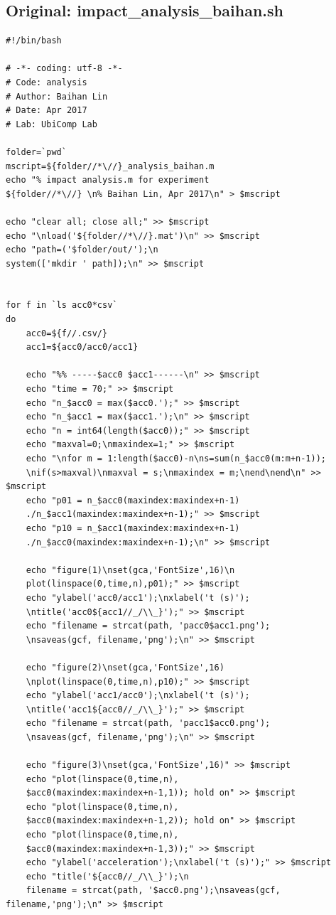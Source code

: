 \documentclass{sigchi}
\begin{document}
\subsection{Original: impact\_analysis\_baihan.sh}\label{ss:ipc_ana.sh}
\begin{lstlisting}
#!/bin/bash

# -*- coding: utf-8 -*-
# Code: analysis
# Author: Baihan Lin
# Date: Apr 2017
# Lab: UbiComp Lab

folder=`pwd`
mscript=${folder//*\//}_analysis_baihan.m
echo "% impact analysis.m for experiment 
${folder//*\//} \n% Baihan Lin, Apr 2017\n" > $mscript

echo "clear all; close all;" >> $mscript
echo "\nload('${folder//*\//}.mat')\n" >> $mscript
echo "path=('$folder/out/');\n
system(['mkdir ' path]);\n" >> $mscript


for f in `ls acc0*csv`
do
    acc0=${f//.csv/}
    acc1=${acc0/acc0/acc1}

	echo "%% -----$acc0 $acc1------\n" >> $mscript
	echo "time = 70;" >> $mscript
    echo "n_$acc0 = max($acc0.');" >> $mscript
    echo "n_$acc1 = max($acc1.');\n" >> $mscript
    echo "n = int64(length($acc0));" >> $mscript
    echo "maxval=0;\nmaxindex=1;" >> $mscript
    echo "\nfor m = 1:length($acc0)-n\ns=sum(n_$acc0(m:m+n-1));
    \nif(s>maxval)\nmaxval = s;\nmaxindex = m;\nend\nend\n" >> $mscript
    echo "p01 = n_$acc0(maxindex:maxindex+n-1)
    ./n_$acc1(maxindex:maxindex+n-1);" >> $mscript
    echo "p10 = n_$acc1(maxindex:maxindex+n-1)
    ./n_$acc0(maxindex:maxindex+n-1);\n" >> $mscript

	echo "figure(1)\nset(gca,'FontSize',16)\n
    plot(linspace(0,time,n),p01);" >> $mscript
	echo "ylabel('acc0/acc1');\nxlabel('t (s)');
    \ntitle('acc0${acc1//_/\\_}');" >> $mscript
	echo "filename = strcat(path, 'pacc0$acc1.png');
    \nsaveas(gcf, filename,'png');\n" >> $mscript

	echo "figure(2)\nset(gca,'FontSize',16)
    \nplot(linspace(0,time,n),p10);" >> $mscript
	echo "ylabel('acc1/acc0');\nxlabel('t (s)');
    \ntitle('acc1${acc0//_/\\_}');" >> $mscript
	echo "filename = strcat(path, 'pacc1$acc0.png');
    \nsaveas(gcf, filename,'png');\n" >> $mscript

	echo "figure(3)\nset(gca,'FontSize',16)" >> $mscript
	echo "plot(linspace(0,time,n),
    $acc0(maxindex:maxindex+n-1,1)); hold on" >> $mscript
	echo "plot(linspace(0,time,n),
    $acc0(maxindex:maxindex+n-1,2)); hold on" >> $mscript
	echo "plot(linspace(0,time,n),
    $acc0(maxindex:maxindex+n-1,3));" >> $mscript
	echo "ylabel('acceleration');\nxlabel('t (s)');" >> $mscript
	echo "title('${acc0//_/\\_}');\n
    filename = strcat(path, '$acc0.png');\nsaveas(gcf, filename,'png');\n" >> $mscript


\end{lstlisting}
\end{document}
